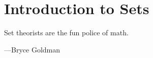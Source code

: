 \documentclass[../main.tex]{subfiles}
\begin{document}
\chapter{Introduction to Sets}
\epigraph{Set theorists are the fun police of math.}
{---Bryce Goldman}




% 
\end{document}
